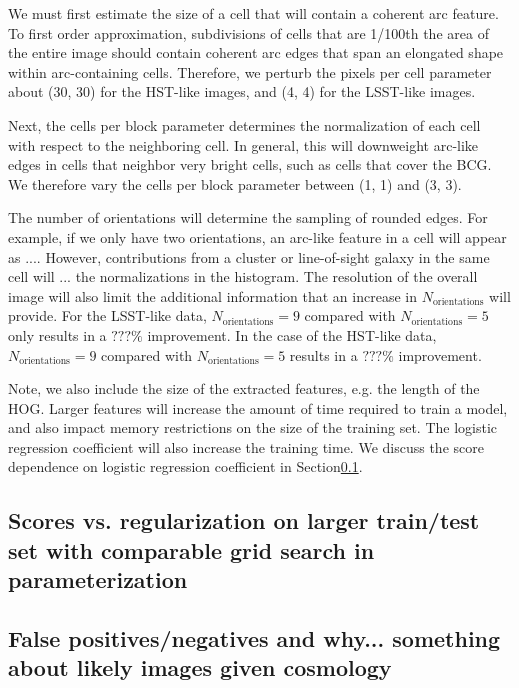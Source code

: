 \documentclass{emulateapj}
\begin{document}
We must first estimate the size of a cell that will contain a coherent
arc feature.  To first order approximation, subdivisions of cells that
are 1/100th the area of the entire image should contain coherent arc
edges that span an elongated shape within arc-containing cells.
Therefore, we perturb the pixels per cell parameter about (30, 30) for
the HST-like images, and (4, 4) for the LSST-like images.

Next, the cells per block parameter determines the normalization of
each cell with respect to the neighboring cell.  In general, this will
downweight arc-like edges in cells that neighbor very bright cells,
such as cells that cover the BCG.  We therefore vary the cells per
block parameter between (1, 1) and (3, 3).

The number of orientations will determine the sampling of rounded
edges.  For example, if we only have two orientations, an arc-like
feature in a cell will appear as .... However, contributions from a
cluster or line-of-sight galaxy in the same cell will ... the
normalizations in the histogram.  The resolution of the overall image
will also limit the additional information that an increase in
$N_\text{orientations}$ will provide.  For the LSST-like data,
$N_\text{orientations}=9$ compared with $N_\text{orientations}=5$ only
results in a $???\%$ improvement.  In the case of the HST-like data,
$N_\text{orientations}=9$ compared with $N_\text{orientations}=5$
results in a $???\%$ improvement.

Note, we also include the size of the extracted features, e.g. the
length of the HOG.  Larger features will increase the amount of time
required to train a model, and also impact memory restrictions on the
size of the training set.  The logistic regression coefficient will
also increase the training time.  We discuss the score dependence on
logistic regression coefficient in Section\ref{sec:unregularizedfit}.


\subsection{Scores vs. regularization on larger train/test set with comparable grid search in parameterization}\label{sec:unregularizedfit}

\subsection{False positives/negatives and why... something about likely images given cosmology}
\end{document}
